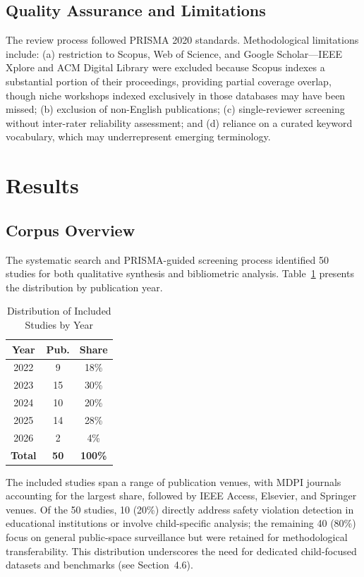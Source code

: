 \documentclass[conference]{IEEEtran}
\begin{document}
\subsection{Quality Assurance and Limitations}

The review process followed PRISMA 2020 standards. Methodological limitations include: (a) restriction to Scopus, Web of Science, and Google Scholar---IEEE Xplore and ACM Digital Library were excluded because Scopus indexes a substantial portion of their proceedings, providing partial coverage overlap, though niche workshops indexed exclusively in those databases may have been missed; (b) exclusion of non-English publications; (c) single-reviewer screening without inter-rater reliability assessment; and (d) reliance on a curated keyword vocabulary, which may underrepresent emerging terminology.

\section{Results}

\subsection{Corpus Overview}

The systematic search and PRISMA-guided screening process identified 50 studies for both qualitative synthesis and bibliometric analysis. Table~\ref{tab:years} presents the distribution by publication year.

\begin{table}[t]
\caption{Distribution of Included Studies by Year}
\begin{center}
\renewcommand{\arraystretch}{1.0}
\begin{tabular}{|c|c|c|}
\hline
\textbf{Year} & \textbf{Pub.} & \textbf{Share} \\
\hline
2022 & 9 & 18\% \\
2023 & 15 & 30\% \\
2024 & 10 & 20\% \\
2025 & 14 & 28\% \\
2026 & 2 & 4\% \\
\hline
\textbf{Total} & \textbf{50} & \textbf{100\%} \\
\hline
\end{tabular}
\label{tab:years}
\end{center}
\end{table}

The included studies span a range of publication venues, with MDPI journals accounting for the largest share, followed by IEEE Access, Elsevier, and Springer venues. Of the 50 studies, 10 (20\%) directly address safety violation detection in educational institutions or involve child-specific analysis; the remaining 40 (80\%) focus on general public-space surveillance but were retained for methodological transferability. This distribution underscores the need for dedicated child-focused datasets and benchmarks (see Section~4.6).
\end{document}
